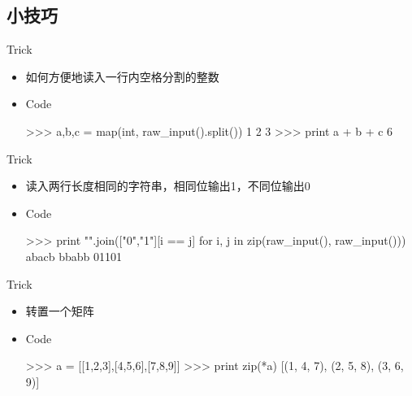 \documentclass[xcolor=dvipsnames, 9pt]{beamer}
\newenvironment{code}{\begin{semiverbatim} \begin{footnotesize}}{\end{footnotesize}\end{semiverbatim}}
\begin{document}
\subsection{小技巧}
\begin{frame}[fragile]{Trick}
	\begin{itemize}
		\item<1-> 如何方便地读入一行内空格分割的整数
			\vspace{0.1cm}
		\item<2->[]\begin{exampleblock}{Code}\begin{code}
				>>> a,b,c = map(int, raw_input().split())
				1 2 3
				>>> print a + b + c
				6
			\end{code}\end{exampleblock}
	\end{itemize}
\end{frame}

\begin{frame}[fragile]{Trick}
	\begin{itemize}
		\item<1-> 读入两行长度相同的字符串，相同位输出1，不同位输出0
			\vspace{0.1cm}
		\item<2->[]\begin{exampleblock}{Code}\begin{code}
				>>> print "".join(["0","1"][i == j] for i, j in zip(raw_input(), raw_input()))
				abacb
				bbabb
				01101
			\end{code}\end{exampleblock}
	\end{itemize}
\end{frame}


\begin{frame}[fragile]{Trick}
	\begin{itemize}
		\item<1-> 转置一个矩阵
			\vspace{0.1cm}
		\item<2->[]\begin{exampleblock}{Code}\begin{code}
				>>> a = [[1,2,3],[4,5,6],[7,8,9]]
				>>> print zip(*a)
				[(1, 4, 7), (2, 5, 8), (3, 6, 9)]
			\end{code}\end{exampleblock}
	\end{itemize}
\end{frame}
\end{document}
